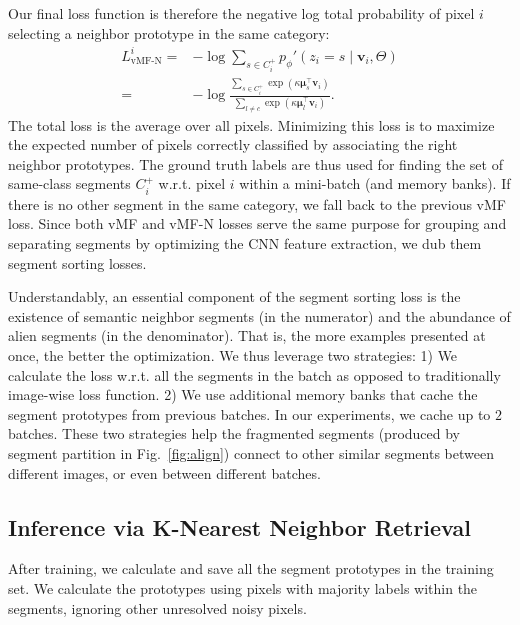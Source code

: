 \documentclass[10pt,twocolumn,letterpaper]{article}
\begin{document}
Our final loss function is therefore the negative log total probability of pixel $i$ selecting a neighbor prototype in the same category:
\begin{align}
\label{eqn:vmfn_loss}
\nonumber L_{\text{vMF-N}}^i =& -\log \sum_{s\in C_i^+} p_\phi'(z_i=s\mid \pmb{v}_i, \Theta) \\
=& -\log \frac{ \sum_{s\in C_i^+} \exp(\kappa \pmb{\mu}_s^\top \pmb{v}_i) }{ \sum_{l\neq c} \exp(\kappa \pmb{\mu}_l^\top \pmb{v}_i) }.
\end{align}
The total loss is the average over all pixels.
Minimizing this loss is to maximize the expected number of pixels correctly classified by associating the right neighbor prototypes.
The ground truth labels are thus used for finding the set of same-class segments $C^+_i$ w.r.t. pixel $i$ within a mini-batch (and memory banks).
If there is no other segment in the same category, we fall back to the previous vMF loss.
Since both vMF and vMF-N losses serve the same purpose for grouping and separating segments by optimizing the CNN feature extraction, we dub them segment sorting losses.


Understandably, an essential component of the segment sorting loss is the existence of semantic neighbor segments (in the numerator) and the abundance of alien segments (in the denominator).
That is, the more examples presented at once, the better the optimization.
We thus leverage two strategies:
1) We calculate the loss w.r.t. all the segments in the batch as opposed to traditionally image-wise loss function.
2) We use additional memory banks that cache the segment prototypes from previous batches.
In our experiments, we cache up to $2$ batches.
These two strategies help the fragmented segments (produced by segment partition in Fig.~\ref{fig:align}) connect to other similar segments between different images, or even between different batches.







\subsection{Inference via K-Nearest Neighbor Retrieval}
\label{sec:inference}

After training, we calculate and save all the segment prototypes in the training set.
We calculate the prototypes using pixels with majority labels within the segments, ignoring other unresolved noisy pixels.
\end{document}
